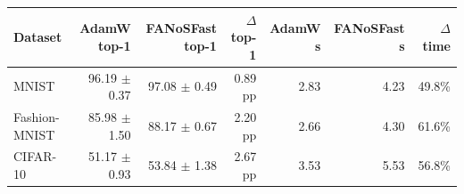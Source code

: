 \begin{tabular}{lrrrrrr}
\toprule
Dataset & AdamW top-1 & FANoSFast top-1 & $\Delta$ top-1 & AdamW s & FANoSFast s & $\Delta$ time \\
\midrule
MNIST & 96.19 $\pm$ 0.37 & 97.08 $\pm$ 0.49 & 0.89 pp & 2.83 & 4.23 & 49.8\% \\
Fashion-MNIST & 85.98 $\pm$ 1.50 & 88.17 $\pm$ 0.67 & 2.20 pp & 2.66 & 4.30 & 61.6\% \\
CIFAR-10 & 51.17 $\pm$ 0.93 & 53.84 $\pm$ 1.38 & 2.67 pp & 3.53 & 5.53 & 56.8\% \\
\bottomrule
\end{tabular}
